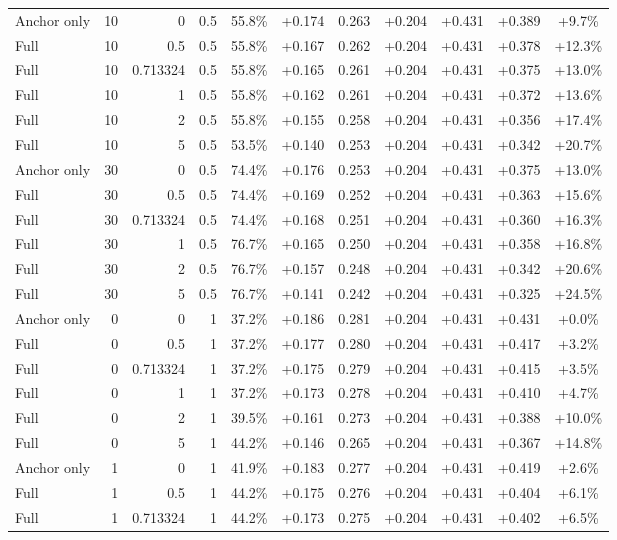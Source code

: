 \begin{table}[htbp]
\begin{tabular}{lrrrccccccc}
Anchor only & 10 & 0 & 0.5 & 55.8\% & +0.174 & 0.263 & +0.204 & +0.431 & +0.389 & +9.7\% \\
Full & 10 & 0.5 & 0.5 & 55.8\% & +0.167 & 0.262 & +0.204 & +0.431 & +0.378 & +12.3\% \\
Full & 10 & 0.713324 & 0.5 & 55.8\% & +0.165 & 0.261 & +0.204 & +0.431 & +0.375 & +13.0\% \\
Full & 10 & 1 & 0.5 & 55.8\% & +0.162 & 0.261 & +0.204 & +0.431 & +0.372 & +13.6\% \\
Full & 10 & 2 & 0.5 & 55.8\% & +0.155 & 0.258 & +0.204 & +0.431 & +0.356 & +17.4\% \\
Full & 10 & 5 & 0.5 & 53.5\% & +0.140 & 0.253 & +0.204 & +0.431 & +0.342 & +20.7\% \\
Anchor only & 30 & 0 & 0.5 & 74.4\% & +0.176 & 0.253 & +0.204 & +0.431 & +0.375 & +13.0\% \\
Full & 30 & 0.5 & 0.5 & 74.4\% & +0.169 & 0.252 & +0.204 & +0.431 & +0.363 & +15.6\% \\
Full & 30 & 0.713324 & 0.5 & 74.4\% & +0.168 & 0.251 & +0.204 & +0.431 & +0.360 & +16.3\% \\
Full & 30 & 1 & 0.5 & 76.7\% & +0.165 & 0.250 & +0.204 & +0.431 & +0.358 & +16.8\% \\
Full & 30 & 2 & 0.5 & 76.7\% & +0.157 & 0.248 & +0.204 & +0.431 & +0.342 & +20.6\% \\
Full & 30 & 5 & 0.5 & 76.7\% & +0.141 & 0.242 & +0.204 & +0.431 & +0.325 & +24.5\% \\
Anchor only & 0 & 0 & 1 & 37.2\% & +0.186 & 0.281 & +0.204 & +0.431 & +0.431 & +0.0\% \\
Full & 0 & 0.5 & 1 & 37.2\% & +0.177 & 0.280 & +0.204 & +0.431 & +0.417 & +3.2\% \\
Full & 0 & 0.713324 & 1 & 37.2\% & +0.175 & 0.279 & +0.204 & +0.431 & +0.415 & +3.5\% \\
Full & 0 & 1 & 1 & 37.2\% & +0.173 & 0.278 & +0.204 & +0.431 & +0.410 & +4.7\% \\
Full & 0 & 2 & 1 & 39.5\% & +0.161 & 0.273 & +0.204 & +0.431 & +0.388 & +10.0\% \\
Full & 0 & 5 & 1 & 44.2\% & +0.146 & 0.265 & +0.204 & +0.431 & +0.367 & +14.8\% \\
Anchor only & 1 & 0 & 1 & 41.9\% & +0.183 & 0.277 & +0.204 & +0.431 & +0.419 & +2.6\% \\
Full & 1 & 0.5 & 1 & 44.2\% & +0.175 & 0.276 & +0.204 & +0.431 & +0.404 & +6.1\% \\
Full & 1 & 0.713324 & 1 & 44.2\% & +0.173 & 0.275 & +0.204 & +0.431 & +0.402 & +6.5\% \\

\end{tabular}
\end{table}
